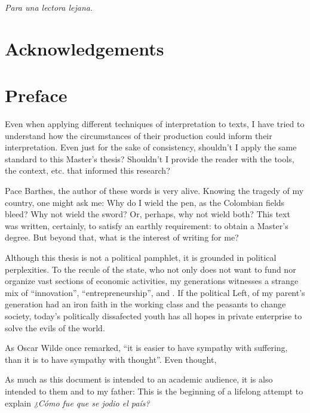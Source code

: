 \documentclass[draft=false, paper=A4,portrait,twoside=true,twocolumn=false,headinclude=false,footinclude=false,fontsize=11,BCOR=15mm,DIV=calc,pagesize=auto,titlepage=firstiscover,mpinclude=true,headings=big,headings=twolinechapter,open=right,chapterprefix=false,headsepline=false,parskip=full]{scrbook}
\begin{document}
\newpage 

\begin{FlushRight}
\begin{spanish}
\textit{Para una lectora lejana.}
\end{spanish}
\end{FlushRight}

\newpage
\tableofcontents 

\frontmatter
\pagestyle{plain}
\chapter{Acknowledgements} 

\lipsum

\chapter{Preface} 

Even when applying different techniques of interpretation to texts, I have
tried to understand how the circumstances of their production could inform
their interpretation. Even just for the sake of consistency, shouldn't I
apply the same standard to this Master's thesis? Shouldn't I provide the
reader with the tools, the context, etc. that informed this research?

Pace Barthes, the author of these words is very alive. Knowing the tragedy
of my country, one might ask me: Why do I wield the pen, as the Colombian
fields bleed? Why not wield the sword? Or, perhaps, why not wield both?
This text was written, certainly, to satisfy an earthly requirement: to
obtain a Master's degree. But beyond that, what is the interest of writing
for me?

Although this thesis is not a political pamphlet, it is grounded in
political perplexities. To the recule of the state, who not only does not
want to fund nor organize vast sections of economic activities, my
generations witnesses a strange mix of ``innovation'',
``entrepreneurship'', and . If the political Left, of my parent's
generation had an iron faith in the working class and the peasants to
change society, today's politically dissafected youth has all hopes in
private enterprise to solve the evils of the world.

As Oscar Wilde once remarked, ``it is easier to have sympathy with
suffering, than it is to have sympathy with thought''. Even thought,

As much as this document is intended to an academic audience, it is also
intended to them and to my father: This is the beginning of a lifelong
attempt to explain \emph{¿Cómo fue que se jodio el país?} 
\end{document}
